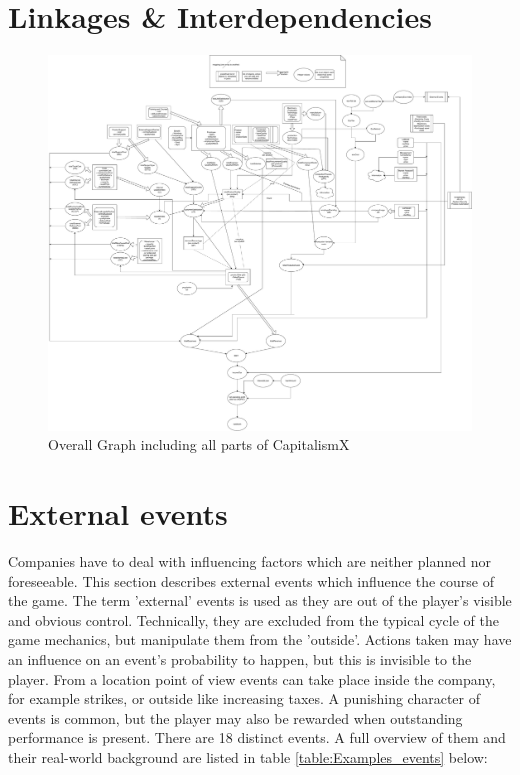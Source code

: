 \documentclass[11pt,titlepage,oneside,openany]{book}
\begin{document}



\section{Linkages \& Interdependencies}
\label{sec:link}
\begin{landscape}
\begin{figure}
    \centering
    \includegraphics[scale = 0.26]{images/Tree-like-thing.pdf}
    \caption{Overall Graph including all parts of CapitalismX}
    \label{fig:OverallGraph}
\end{figure}
\end{landscape}

\section{External events}
\label{sec:ectEvent}
Companies have to deal with influencing factors which are neither planned nor foreseeable\cite{Campbell}. This section describes external events which influence the course of the game. The term 'external' events is used as they are out of the player's visible and obvious control. Technically, they are excluded from the typical cycle of the game mechanics, but manipulate them from the 'outside'. Actions taken may have an influence on an event's probability to happen, but this is invisible to the player. From a location point of view events can take place inside the company, for example strikes, or outside like increasing taxes. A punishing character of events is common, but the player may also be rewarded when outstanding performance is present. There are 18 distinct events. A full overview of them and their real-world background are listed in table \ref{table:Examples_events} below: \\ 
\end{document}
